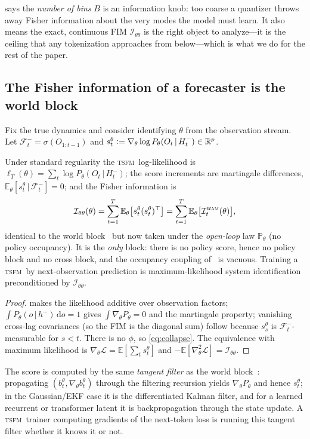 \documentclass[10pt]{article}
\theoremstyle{plain}
\theoremstyle{definition}
\theoremstyle{remark}
\newcommand{\R}{\mathbb{R}}
\newcommand{\E}{\mathbb{E}}
\newcommand{\Prob}{\mathbb{P}}
\newcommand{\Fisher}{\mathcal{I}}
\newcommand{\Ith}{\Fisher_{\theta\theta}}
\newcommand{\given}{\,\vert\,}
\newcommand{\defeq}{\vcentcolon=}
\newcommand{\gth}{\nabla_{\theta}}
\newcommand{\wm}{P_{\theta}}
\newcommand{\TSFM}{\textsc{tsfm}}
\newcommand{\WAM}{\textsc{wam}}
\begin{document}
 says the \emph{number of bins} $B$ is an information knob: too
coarse a quantizer throws away Fisher information about the very modes the model
must learn. It also means the exact, continuous FIM $\Ith$ is the right object to
analyze---it is the ceiling that any tokenization approaches from below---which
is what we do for the rest of the paper.

\subsection{The Fisher information of a forecaster is the world block}
Fix the true dynamics and consider identifying $\theta$ from the observation
stream. Let $\mathcal F_t^-=\sigma(O_{1:t-1})$ and
$s_t^\theta\defeq\gth\log\wm(O_t\given H_t^-)\in\R^p$.

\begin{proposition}\label{prop:tsfmwam}
Under standard regularity the \TSFM\ log-likelihood is
$\ell_T(\theta)=\sum_t\log\wm(O_t\given H_t^-)$; the score increments are
martingale differences, $\E_\theta[s_t^\theta\given\mathcal F_t^-]=0$; and the
Fisher information is
\begin{equation}
 \Ith(\theta)=\sum_{t=1}^T\E_\theta\big[s_t^\theta(s_t^\theta)^\top\big]
 =\sum_{t=1}^T\E_\theta\big[\Fisher_t^{\WAM}(\theta)\big],
 \label{eq:tsfmfim}
\end{equation}
identical to the world block~\cite[Prop.~4.1]{wamvla} but now taken under the
\emph{open-loop} law $\Prob_\theta$ (no policy occupancy). It is the \emph{only}
block: there is no policy score, hence no policy block and no cross block, and
the occupancy coupling of~\cite[Prop.~6.3]{wamvla} is vacuous. Training a \TSFM\
by next-observation prediction is maximum-likelihood system identification
preconditioned by $\Ith$.
\end{proposition}
\begin{proof}
 makes the likelihood additive over observation factors;
$\int\wm(o\given h^-)\,\mathrm do=1$ gives $\int\gth\wm=0$ and the martingale
property; vanishing cross-lag covariances (so the FIM is the diagonal sum) follow
because $s_s^\theta$ is $\mathcal F_t^-$-measurable for $s<t$. There is no
$\phi$, so \eqref{eq:collapse}. The equivalence with maximum likelihood is
$\gth\mathcal L=\E[\sum_t s_t^\theta]$ and $-\E[\nabla_\theta^2\mathcal
L]=\Ith$.
\end{proof}

The score is computed by the same \emph{tangent filter} as the world
block~\cite[\S4.1]{wamvla}: propagating $(b_t^\theta,\gth b_t^\theta)$ through
the filtering recursion yields $\gth\wm$ and hence $s_t^\theta$; in the
Gaussian/EKF case it is the differentiated Kalman filter, and for a learned
recurrent or transformer latent it is backpropagation through the state update.
A \TSFM\ trainer computing gradients of the next-token loss is running this
tangent filter whether it knows it or not.
\end{document}
